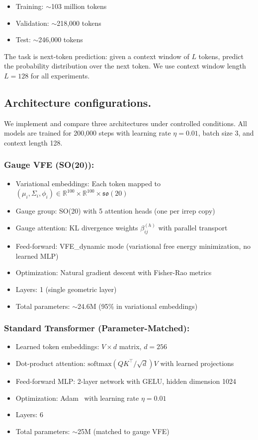 \documentclass[twoside,11pt]{article}
\begin{document}
\begin{itemize}
  \item Training: $\sim$103 million tokens
  \item Validation: $\sim$218,000 tokens
  \item Test: $\sim$246,000 tokens
\end{itemize}

The task is next-token prediction: given a context window of $L$ tokens, predict the probability distribution over the next token. We use context window length $L=128$ for all experiments.

\subsection{Architecture configurations.}
We implement and compare three architectures under controlled conditions. All models are trained for 200,000 steps with learning rate $\eta = 0.01$, batch size 3, and context length 128.

\subsubsection{Gauge VFE (SO(20)):}
\begin{itemize}
  \item Variational embeddings: Each token mapped to $(\mu_i, \Sigma_i, \phi_i) \in \mathbb{R}^{100} \times \mathbb{R}^{100} \times \mathfrak{so}(20)$
  \item Gauge group: SO(20) with 5 attention heads (one per irrep copy)
  \item Gauge attention: KL divergence weights $\beta_{ij}^{(h)}$ with parallel transport
  \item Feed-forward: VFE\_dynamic mode (variational free energy minimization, no learned MLP)
  \item Optimization: Natural gradient descent with Fisher-Rao metrics
  \item Layers: 1 (single geometric layer)
  \item Total parameters: $\sim$24.6M (95\% in variational embeddings)
\end{itemize}

\subsubsection{Standard Transformer (Parameter-Matched):}
\begin{itemize}
  \item Learned token embeddings: $V \times d$ matrix, $d=256$
  \item Dot-product attention: $\text{softmax}(QK^\top/\sqrt{d})V$ with learned projections
  \item Feed-forward MLP: 2-layer network with GELU, hidden dimension 1024
  \item Optimization: Adam~\citep{kingma2014adam} with learning rate $\eta = 0.01$
  \item Layers: 6
  \item Total parameters: $\sim$25M (matched to gauge VFE)
\end{itemize}
\end{document}
